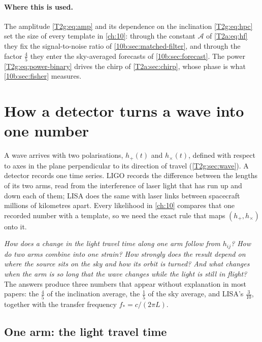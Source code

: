 \paragraph{Where this is used.}
The amplitude \eqref{T2g:eq:amp} and its dependence on the inclination \eqref{T2g:eq:hpc} set the size of every template in \cref{ch:10}: through the constant $\mathcal A$ of \eqref{T2a:eq:hf} they fix the signal-to-noise ratio of \cref{10b:sec:matched-filter}, and through the factor $\tfrac45$ they enter the sky-averaged forecasts of \cref{10b:sec:forecast}. The power \eqref{T2g:eq:power-binary} drives the chirp of \cref{T2a:sec:chirp}, whose phase is what \cref{10b:sec:fisher} measures.
\section{How a detector turns a wave into one number}
\label{T2g:sec:detector}

A wave arrives with two polarisations, $h_+(t)$ and $h_\times(t)$, defined with respect to axes in the plane perpendicular to its direction of travel (\cref{T2g:sec:wave}). A detector records one time series. LIGO records the difference between the lengths of its two arms, read from the interference of laser light that has run up and down each of them; LISA does the same with laser links between spacecraft millions of kilometres apart. Every likelihood in \cref{ch:10} compares that one recorded number with a template, so we need the exact rule that maps $(h_+,h_\times)$ onto it.

\emph{How does a change in the light travel time along one arm follow from $h_{ij}$? How do two arms combine into one strain? How strongly does the result depend on where the source sits on the sky and how its orbit is turned? And what changes when the arm is so long that the wave changes while the light is still in flight?} The answers produce three numbers that appear without explanation in most papers: the $\tfrac45$ of the inclination average, the $\tfrac15$ of the sky average, and LISA's $\tfrac{3}{10}$, together with the transfer frequency $f_*=c/(2\pi L)$.

\subsection{One arm: the light travel time}

